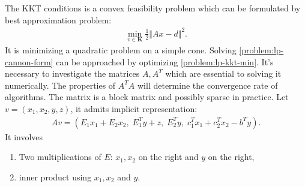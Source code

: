\documentclass[12pt]{report}
\begin{document}
            The KKT conditions is a convex feasibility problem which can be formulated by best approximation problem: 
            \begin{align}\label{problem:lp-kkt-min}
                \min_{v \in \mathbf K} 
                \frac{1}{2}\Vert Ax - d \Vert^2. 
            \end{align}
            It is minimizing a quadratic problem on a simple cone. 
            Solving \eqref{problem:lp-cannon-form} can be approached by optimizing \eqref{problem:lp-kkt-min}. 
            It's necessary to investigate the matrices $A, A^T$ which are essential to solving it numerically. 
            The properties of $A^TA$ will determine the convergence rate of algorithms. 
            The matrix is a block matrix and possibly sparse in practice. 
            Let $v = (x_1, x_2, y, z)$, it admits implicit representation: 
            \begin{align*}
                Av = (E_1x_1 + E_2 x_2,\; E_1^Ty + z,\; E_2^Ty,\; c^T_1x_1 + c_2^Tx_2 - b^Ty). 
            \end{align*}
            It involves 
            \begin{enumerate}
                \item Two multiplications of $E$: $x_1, x_2$ on the right and $y$ on the right,  
                \item inner product using $x_1, x_2$ and $y$. 
            \end{enumerate}
            
\end{document}
